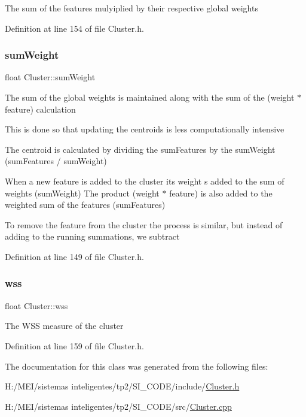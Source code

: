 The sum of the features mulyiplied by their respective global weights 

Definition at line 154 of file Cluster.\+h.

\mbox{\label{class_cluster_a1380f8914d5f22ca56afe13dd323d8e5}} 
\subsubsection{\texorpdfstring{sum\+Weight}{sumWeight}}
{\footnotesize\ttfamily float Cluster\+::sum\+Weight\hspace{0.3cm}{\ttfamily [protected]}}

The sum of the global weights is maintained along with the sum of the (weight $\ast$ feature) calculation

This is done so that updating the centroids is less computationally intensive

The centroid is calculated by dividing the sum\+Features by the sum\+Weight (sum\+Features / sum\+Weight)

When a new feature is added to the cluster its weight s added to the sum of weights (sum\+Weight) The product (weight $\ast$ feature) is also added to the weighted sum of the features (sum\+Features)

To remove the feature from the cluster the process is similar, but instead of adding to the running summations, we subtract 

Definition at line 149 of file Cluster.\+h.

\mbox{\label{class_cluster_a3485a5dc53d0094f618b9308aea59288}} 
\subsubsection{\texorpdfstring{wss}{wss}}
{\footnotesize\ttfamily float Cluster\+::wss\hspace{0.3cm}{\ttfamily [protected]}}

The W\+SS measure of the cluster 

Definition at line 159 of file Cluster.\+h.



The documentation for this class was generated from the following files\+:\begin{DoxyCompactItemize}
\item 
H\+:/\+M\+E\+I/sistemas inteligentes/tp2/\+S\+I\+\_\+\+C\+O\+D\+E/include/\hyperlink{_cluster_8h}{Cluster.\+h}\item 
H\+:/\+M\+E\+I/sistemas inteligentes/tp2/\+S\+I\+\_\+\+C\+O\+D\+E/src/\hyperlink{_cluster_8cpp}{Cluster.\+cpp}\end{DoxyCompactItemize}
